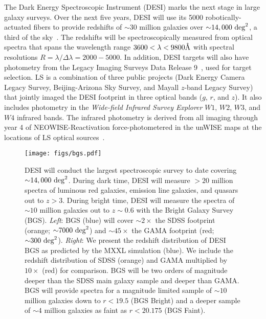 The Dark Energy Spectroscopic Instrument (DESI) marks the next stage in large
galaxy surveys. 
Over the next five years, DESI will use its 5000 robotically-actuated fibers to
provide redshifts of ${\sim}30$ million galaxies over 
${\sim}14,000~{\rm deg}^2$, a third of the sky~\citep{desicollaboration2016,
desicollaboration2016a}.
The redshifts will be spectroscopically measured from optical spectra that
spans the wavelength range $3600 < \lambda < 9800\AA$ with spectral resolutions
$R = \lambda/\Delta \lambda = 2000 - 5000$.
In addition, DESI targets will also have photometry from the Legacy Imaging
Surveys Data Release 9~\citep[LS][]{dey2019}, used for target selection. 
LS is a combination of three public projects (Dark Energy Camera Legacy Survey,
Beijing-Arizona Sky Survey, and Mayall $z$-band Legacy Survey) that jointly
imaged the DESI footprint in three optical bands ($g$, $r$, and $z$). 
It also includes photometry in the \emph{Wide-field Infrared Survey Explorer}
$W1$, $W2$, $W3$, and $W4$ infrared bands.
The infrared photometry is derived from all imaging through year 4 of
NEOWISE-Reactivation force-photometered in the unWISE maps at the locations of
LS optical sources~\citep{meisner2017, meisner2017a}.

\begin{figure}
\begin{center}
\texttt{[image: figs/bgs.pdf]} 
\caption{
    DESI will conduct the largest spectroscopic survey to date covering
    ${\sim}14,000~{\rm deg}^2$. 
    During dark time, DESI will measure ${>}20$ million spectra of luminous red
    galaxies, emission line galaxies, and quasars out to $z > 3$.
    During bright time, DESI will measure the spectra of ${\sim}10$ million
    galaxies out to $z{\sim}0.6$ with the Bright Galaxy Survey (BGS).
    {\em Left}: BGS (blue) will cover ${\sim}2\times$ the SDSS footprint
    (orange; ${\sim}7000~{\rm deg}^2$) and ${\sim}45\times$ the GAMA footprint
    (red; ${\sim}300~{\rm deg}^2$).
    {\em Right}: We present the redshift distribution of DESI BGS as predicted
    by the MXXL simulation (blue).  
    We include the redshift distribution of SDSS (orange) and GAMA multiplied
    by $10\times$ (red) for comparison. 
    BGS will be two orders of magnitude deeper than the SDSS main galaxy sample
    and deeper than GAMA.
    BGS will provide spectra for a magnitude limited sample of ${\sim}10$
    million galaxies down to $r < 19.5$ (BGS Bright) and a deeper sample of
    ${\sim 4}$ million galaxies as faint as $r < 20.175$ (BGS Faint).
}
\label{fig:bgs}
\end{center}
\end{figure}

